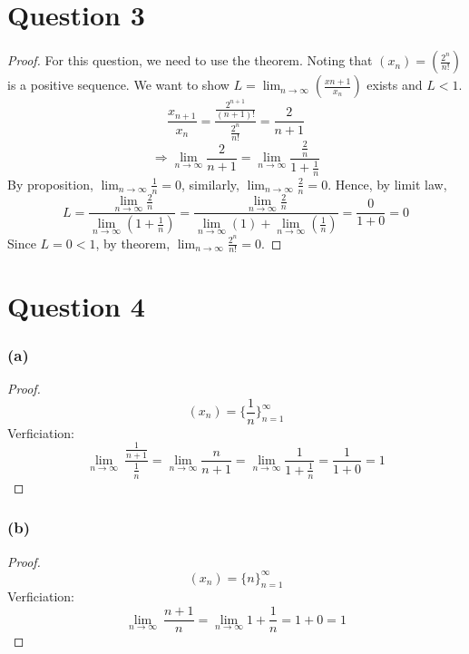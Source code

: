 \documentclass{article}
\begin{document}
\section*{Question 3}
\begin{proof}
    For this question, we need to use the theorem. Noting that \( (x_n) = (\frac{2^n}{n!}) \) is a positive sequence.
    We want to show \( L = \lim_{n \rightarrow \infty} (\frac{x{n + 1}}{x_n}) \) exists and $L < 1$.
    \\
    \[ \frac{x_{n+1}}{x_n} = \frac{\frac{2^{n+1}}{(n+1)!}}{\frac{2^n}{n!}} = \frac{2}{n + 1} \]
    \[ \Rightarrow \lim_{n \rightarrow \infty} \frac{2}{n + 1}  = \lim_{n \rightarrow \infty} \frac{\frac{2}{n}}{1 + \frac{1}{n}} \]
    By proposition, \( \lim_{n \rightarrow \infty} \frac{1}{n} = 0 \), similarly, \( \lim_{n \rightarrow \infty} \frac{2}{n} = 0 \). Hence, by limit law,
    \[ L = \frac{\lim_{n \rightarrow \infty} \frac{2}{n}}{\lim_{n \rightarrow \infty} (1 + \frac{1}{n})} = \frac{\lim_{n \rightarrow \infty} \frac{2}{n}}{\lim_{n \rightarrow \infty} (1) + \lim_{n \rightarrow \infty} (\frac{1}{n})} = \frac{0}{1 + 0} = 0 \]
    Since $L = 0 < 1$, by theorem, \(\lim_{n \rightarrow \infty} \frac{2^n}{n!} = 0\).
\end{proof}

\section*{Question 4}

\subsubsection*{(a)}
\begin{proof}
    \[ (x_n) = \{\frac{1}{n}\}_{n=1}^{\infty} \]
    Verficiation:
    \[ \lim_{n \rightarrow \infty} \ \frac{\frac{1}{n+1}}{\frac{1}{n}} = \lim_{n \rightarrow \infty} \frac{n}{n + 1} = \lim_{n \rightarrow \infty} \frac{1}{1 + \frac{1}{n}} = \frac{1}{1 + 0} = 1 \]
\end{proof}

\subsubsection*{(b)}
\begin{proof}
    \[ (x_n) = \{n\}_{n=1}^{\infty} \]
    Verficiation:
    \[ \lim_{n \rightarrow \infty} \ \frac{n+1}{n} = \lim_{n \rightarrow \infty} 1 + \frac{1}{n} = 1 + 0 = 1\]
\end{proof}
\end{document}
